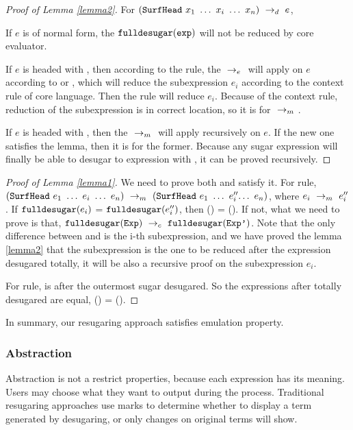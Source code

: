 \begin{proof}[Proof of Lemma \ref{lemma2}]
For $(\mbox{\tt SurfHead}~x_1~\ldots~x_i~\ldots~x_n) ~\rightarrow_d~ e$, 

If $e$ is of normal form, the $\mbox{\tt fulldesugar}(\mbox{\tt exp})$ will not be reduced by core evaluator.

If $e$ is headed with , then according to the  rule, the $~\rightarrow_e~$ will apply on $e$ according to  or , which will reduce the subexpression $e_i$ according to the context rule of core language. Then the  rule will reduce $e_i$. Because of the context rule, reduction of the subexpression is in correct location, so it is for $~\rightarrow_m~$.

If $e$ is headed with , then the $~\rightarrow_m~$ will apply recursively on $e$. If the new one satisfies the lemma, then it is for the former. Because any sugar expression will finally be able to desugar to expression with , it can be proved recursively.
\end{proof}
\begin{proof}[Proof of Lemma \ref{lemma1}]
We need to prove both  and  satisfy it.
For  rule, $\redm{(\m{SurfHead}~e_1~\ldots~e_i~\ldots~e_n)}{(\m{SurfHead}~e_1~\ldots~e_i''$$\ldots~e_n)}$, where $e_i ~\rightarrow_m~e_i''$.
If $\mbox{\tt fulldesugar}(e_i)$ = $\mbox{\tt fulldesugar}(e_i'')$, then () = (). If not,  what we need to prove is that, $\mbox{\tt fulldesugar}(\mbox{\tt Exp}) ~\rightarrow_c~\mbox{\tt fulldesugar}(\mbox{\tt Exp'})$. Note that the only difference between  and  is the i-th subexpression, and we have proved the lemma \ref{lemma2} that the subexpression is the one to be reduced after the expression desugared totally, it will be also a recursive proof on the subexpression $e_i$.

For  rule,  is  after the outermost sugar desugared. So the expressions after totally desugared are equal, () =
().
\end{proof}

In summary, our resugaring approach satisfies emulation property.

\subsubsection{Abstraction}
\label{mark:abs}

Abstraction is not a restrict properties, because each expression has its meaning. Users may choose what they want to output during the process. Traditional resugaring approaches use marks to determine whether to display a term generated by desugaring, or only changes on original terms will show.

